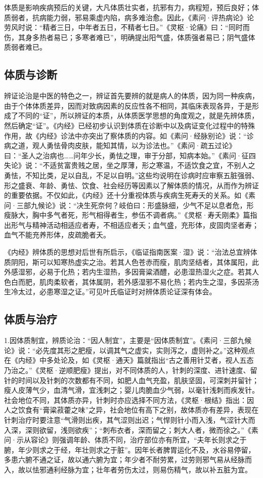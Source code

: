\documentclass[draft,12pt]{ctexbook}
\begin{document}
体质是影响疾病预后的关键，大凡体质壮实者，抗邪有力，病程短，预后良好；体质弱者，抗病能力弱，邪易乘虚内陷，病多难治愈。因此，《素问·评热病论》论劳风时说：“精者三日，中年者五日，不精者七日。”《灵枢·论痛》曰：“同时而伤，其身多热者易已；多寒者难已”，明确提出阳气盛，体质强者易已；阴气盛体质弱者难已。

\subsection{体质与诊断}%

辨证论治是中医的特色之一，辨证首先要辨的就是病人的体质，因为同一种疾病，由于个体体质差异，因而对致病因素的反应性各不相同，其临床表现各异，于是形成了不同的“证”，所以辨证的本质，从体质医学思想的角度观之，就是先辨体质，然后确定“证”。《内经》已经初步认识到体质在诊断中以及病证变化过程中的特殊作用，故《内经》诊法中亦突出了察体质的内容。如《素问·经脉别论》说：“诊病之道，观人勇怯骨肉皮肤，能知其情，以为诊法也。”《素问·疏五过论》曰：“圣人之治病也……问年少长，勇怯之理，审于分部，知病本始。”《素问·征四失论》说：“不适贫富贵贱之居，坐之厚薄，形之寒温，不适饮食之宜，不别人之勇怯，不知比类，足以自乱，不足以自明。”这些均说明在诊病时应审察五脏强弱、形之盛衰、年龄、勇怯、饮食、社会经历等因素以了解体质的情况，从而作为辨证的重要依据。不仅如此，《内经》还十分重视体质与疾病生死寿夭的关系。如《素问·三部九候论》说：“决生死奈何？岐伯曰：形盛脉细，少气不足以息者危，形瘦脉大，胸中多气者死，形气相得者生，参伍不调者病。”《灵枢·寿夭刚柔》篇指出形气与精神活动相适应者寿，不相适应者夭；血气盛，充形体，皮固肉坚者寿；血气不能充养形体，皮疏脆者夭。

《内经》辨体质的思想对后世有所启示，《临证指南医案·湿》说：“治法总宜辨体质阴阳，斯可以知寒热虚实之治。若其人色苍赤而瘦，肌肉坚结者，其体属阳，此外感湿邪，必易于化热；若内生湿热，多因膏粱酒醴，必患湿热湿火之症。若其人色白而肥，肌肉柔软者，其体属阴，若外感湿邪不易化热；若内生之湿，多因茶汤生冷太过，必患寒湿之证。”可见叶氏临证时对辨体质论证深有体会。

\subsection{体质与治疗}%

1.因体质制宜，辨质论治：“因人制宜”，主要是“因体质制宜”。《素问·三部九候论》说：“必先度其形之肥瘦，以调其气之虚实，实则泻之，虚则补之。”这种观点在《内经》中多处论及，如《灵枢·通天》篇就指出“古之善用针艾者，视人五态乃治之。”《灵枢·逆顺肥瘦》提出，对不同体质的人，针刺的深度、进针速度、留针的时间以及针刺的次数都有不同，如肥人血气充盈，肌肤坚固，可深刺并留针；瘦人皮薄气少，血清气滑，宜浅刺之；婴儿肉脆血少气弱，以毫针浅刺而疾发针。社会地位不同，其体质亦异，针刺时亦应选择不同方法，《灵枢·根结》指出：因人之饮食有“膏粱菽藿之味”之异，社会地位有高下之别，故体质亦有差异，表现在针刺治疗时要注意“气滑则出疾，其气涩则出迟；气悍则针小而入浅，气涩针大而入深，深则欲留，浅则欲疾”；“刺布衣者，深而留之；刺大人者，微而徐之。”《素问·示从容论》则强调年龄、体质不同，治疗部位亦有所宜，“夫年长则求之于腑，年少则求之于经，年壮则求之于脏”。因年长者脾胃运化不及，水谷易停留，多患六腑不通之证，故以通六腑为宜；年少者不耐劳累，过劳则邪气易从经脉而入，故以怯邪通利经脉为宜；壮年者劳伤太过，则易伤精气，故以补五脏为宜。
\end{document}
